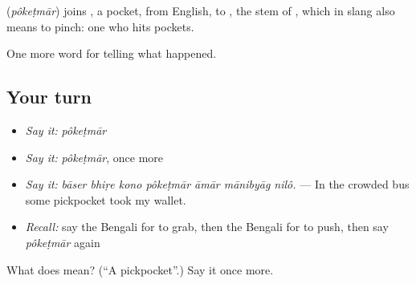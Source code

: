 \begin{cousinweb}
\textbf{} (\emph{pôkeṭmār}) joins \textbf{}, a pocket, from English, to , the stem of \textbf{}, which in slang also means to pinch: one who hits pockets.
\end{cousinweb}

\begin{grammarlens}[title={What you've built}]
One more word for telling what happened.
\end{grammarlens}

\subsection*{Your turn}
\begin{itemize}
\raggedright
  \item \emph{Say it:} \emph{pôkeṭmār}
  \item \emph{Say it:} \emph{pôkeṭmār}, once more
  \item \emph{Say it:} \emph{bāser bhiṛe kono pôkeṭmār āmār mānibyāg nilô.} — In the crowded bus some pickpocket took my wallet.
  \item \emph{Recall:} say the Bengali for to grab, then the Bengali for to push, then say \emph{pôkeṭmār} again
\end{itemize}

\begin{tcolorbox}[breakable,colback=teal!4,colframe=teal!35!black,title={Before you move on}]
What does  mean? (\textquotedblleft{}A pickpocket\textquotedblright{}.) Say it once more.
\end{tcolorbox}
